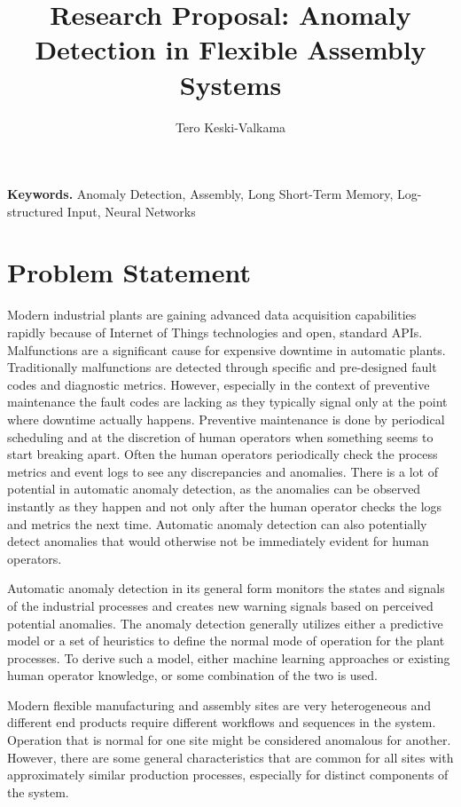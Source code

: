 \documentclass[a4paper,10pt]{article}
\title{Research Proposal: Anomaly Detection in Flexible Assembly Systems}
\author{Tero Keski-Valkama}
\begin{document}
\maketitle

\smallskip
\noindent \textbf{Keywords.} Anomaly Detection, Assembly, Long Short-Term Memory, Log-structured Input, Neural Networks

\section{Problem Statement}

Modern industrial plants are gaining advanced data acquisition capabilities rapidly because of Internet of Things technologies and open, standard APIs.
Malfunctions are a significant cause for expensive downtime in automatic plants. Traditionally malfunctions are detected through specific and pre-designed fault codes
and diagnostic metrics. However, especially in the context of preventive maintenance the fault codes are lacking as they typically signal only at the point where downtime
actually happens. Preventive maintenance is done by periodical scheduling and at the discretion of human operators when something seems to start breaking apart.
Often the human operators periodically check the process metrics and event logs to see any discrepancies and anomalies. There is a lot of potential in automatic anomaly
detection, as the anomalies can be observed instantly as they happen and not only after the human operator checks the logs and metrics the next time. Automatic
anomaly detection can also potentially detect anomalies that would otherwise not be immediately evident for human operators.

Automatic anomaly detection in its general form monitors the states and signals of the industrial processes and creates new warning signals based on perceived potential anomalies.
The anomaly detection generally utilizes either a predictive model or a set of heuristics to define the normal mode of operation for the plant processes. To derive such a model,
either machine learning approaches or existing human operator knowledge, or some combination of the two is used.

Modern flexible manufacturing and assembly sites are very heterogeneous and different end products require different workflows and sequences in the system. Operation that is normal
for one site might be considered anomalous for another. However, there are some general characteristics that are common for all sites with approximately similar
production processes, especially for distinct components of the system.
\end{document}

